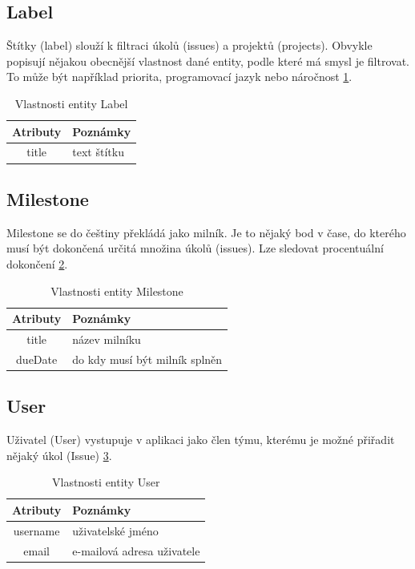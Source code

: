 \subsection{Label}
Štítky (label) slouží k filtraci úkolů (issues) a projektů (projects). Obvykle popisují nějakou obecnější vlastnost dané entity, podle které má smysl je filtrovat. To může být například priorita, programovací jazyk nebo náročnost \ref{tab:label}.

\begin{table}[h]
\begin{center}
	\begin{tabular}{|c|l|}
	\hline
	Atributy & Poznámky \\
	\hline
	title & text štítku \\
	\hline
	\end{tabular}
\end{center}
\caption{Vlastnosti entity Label}
\label{tab:label}
\end{table}

\subsection{Milestone}
Milestone se do češtiny překládá jako milník. Je to nějaký bod v čase, do kterého musí být dokončená určitá množina úkolů (issues). Lze sledovat procentuální dokončení \ref{tab:milestone}.

\begin{table}[h]
\begin{center}
	\begin{tabular}{|c|l|}
	\hline
	Atributy & Poznámky \\
	\hline
	title & název milníku \\
	dueDate & do kdy musí být milník splněn \\
	\hline
	\end{tabular}
\end{center}
\caption{Vlastnosti entity Milestone}
\label{tab:milestone}
\end{table}

\subsection{User}
Uživatel (User) vystupuje v aplikaci jako člen týmu, kterému je možné přiřadit nějaký úkol (Issue) \ref{tab:user}.

\begin{table}[h]
\begin{center}
	\begin{tabular}{|c|l|}
	\hline
	Atributy & Poznámky \\
	\hline
	username & uživatelské jméno \\
	email & e-mailová adresa uživatele \\
	\hline
	\end{tabular}
\end{center}
\caption{Vlastnosti entity User}
\label{tab:user}
\end{table}

